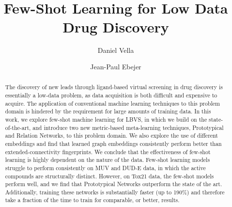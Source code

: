 \documentclass[journal=acscii,manuscript=article]{achemso}
\author{Daniel Vella}
\affiliation{Department of Artificial Intelligence}
\author{Jean-Paul Ebejer}
\affiliation{Centre for Molecular Medicine and Biobanking}
\title
  {Few-Shot Learning for Low Data Drug Discovery}
\begin{document}






\begin{abstract}
  The discovery of new leads through ligand-based virtual screening in drug discovery is essentially a low-data problem, as data acquisition is both difficult and expensive to acquire. The application of conventional machine learning techniques to this problem domain is hindered by the requirement for large amounts of training data. In this work, we explore few-shot machine learning for LBVS, in which we build on the state-of-the-art, and introduce two new metric-based meta-learning techniques, Prototypical and Relation Networks, to this problem domain. We also explore the use of different embeddings and find that learned graph embeddings consistently perform better than extended-connectivity fingerprints. We conclude that the effectiveness of few-shot learning is highly dependent on the nature of the data. Few-shot learning models struggle to perform consistently on MUV and DUD-E data, in which the active compounds are structurally distinct. However, on Tox21 data, the few-shot models perform well, and we find that Prototypical Networks outperform the state of the art. Additionally, training these networks is substantially faster (up to 190\%) and therefore take a fraction of the time to train for comparable, or better, results.
\end{abstract}
\end{document}
